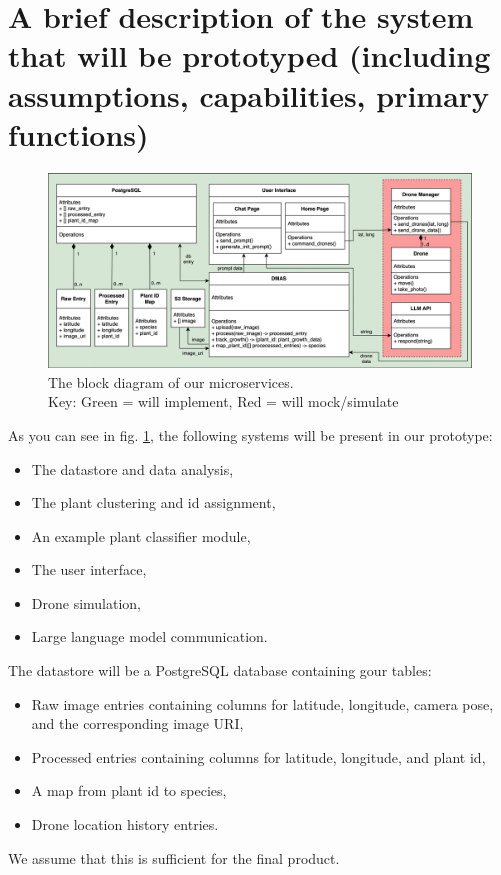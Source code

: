 \documentclass{article}
\begin{document}
\section{A brief description of the system that will be prototyped (including assumptions, capabilities, primary functions)}

\begin{figure}[htbp]
    \includegraphics[width=\textwidth]{block_diagram}
    \caption{The block diagram of our microservices.  \\ 
    Key: Green = will implement, Red = will mock/simulate}
    \label{fig:design}
\end{figure}


As you can see in fig. \ref{fig:design}, the following systems will be present in our prototype:
\begin{itemize}[noitemsep,topsep=3pt]
\item The datastore and data analysis,
\item The plant clustering and id assignment,
\item An example plant classifier module,
\item The user interface,
\item Drone simulation,
\item Large language model communication.
\end{itemize}

\noindent
The datastore will be a PostgreSQL database containing gour tables:
\begin{itemize}[noitemsep,topsep=3pt]
\item Raw image entries containing columns for latitude, longitude, camera pose, and the corresponding image URI,
\item Processed entries containing columns for latitude, longitude, and plant id,
\item A map from plant id to species, 
\item Drone location history entries.
\end{itemize}
We assume that this is sufficient for the final product.
\end{document}
